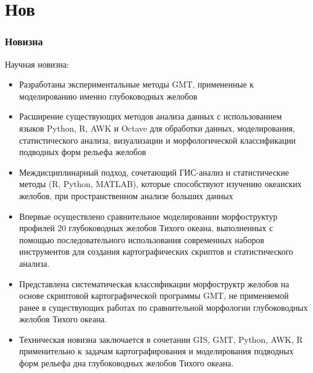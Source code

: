 \documentclass[pdflatex,compress,8pt,
	xcolor={dvipsnames,dvipsnames,svgnames,x11names,table},
	hyperref={colorlinks = true,breaklinks = true, urlcolor = NavyBlue}]{beamer}
\begin{document}
\section{Нов}

\begin{frame}\frametitle{Новизна}
\vspace{1em}
\begin{exampleblock}{Научная новизна:}
\begin{itemize}
	 \item Разработаны экспериментальные методы GMT, примененные к моделированию именно глубоководных желобов
	 \item Расширение существующих методов анализа данных с использованием языков Python, R, AWK и Octave для обработки данных, моделирования, статистического анализа, визуализации и морфологической классификации подводных форм рельефа желобов
	 \item Междисциплинарный подход, сочетающий ГИС-анализ и статистические методы (R, Python, MATLAB), которые способствуют изучению океанских желобов, при пространственном анализе больших данных
	 \item Впервые осуществлено сравнительное моделировании морфоструктур профилей 20 глубоководных желобов Тихого океана, выполненных с помощью последовательного использования современных наборов инструментов для создания картографических скриптов и статистического анализа.
	 \item Представлена систематическая классификации морфоструктр желобов на основе скриптовой картографической программы GMT, не применяемой ранее в существующих работах по сравнительной морфологии глубоководных желобов Тихого океана.
	 \item Техническая новизна заключается в сочетании GIS, GMT, Python, AWK, R \\применительно к задачам картографирования и моделирования подводных\\ форм рельефа дна глубоководных желобов Тихого океана.
\end{itemize}
\end{exampleblock}
\end{frame}
\end{document}
